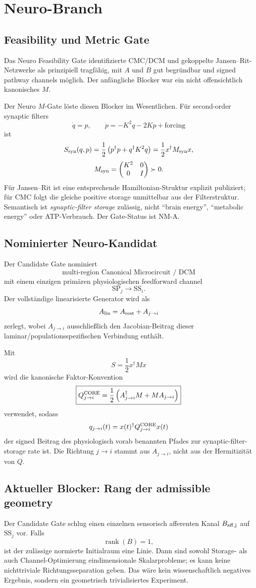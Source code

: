 \section{Neuro-Branch}
\subsection{Feasibility und Metric Gate}
Das Neuro Feasibility Gate identifizierte CMC/DCM und gekoppelte Jansen--Rit-Netzwerke als prinzipiell tragfähig, mit $A$ und $B$ gut begründbar und signed pathway channels möglich. Der anfängliche Blocker war ein nicht offensichtlich kanonisches $M$.

Der Neuro $M$-Gate löste diesen Blocker im Wesentlichen. Für second-order synaptic filters
\[
\dot q=p,
\qquad
\dot p=-K^2q-2Kp+\text{forcing}
\]
ist
\[
S_{\rm syn}(q,p)=\frac12\left(p^\dagger p+q^\dagger K^2q\right)
=\frac12x^\dagger M_{\rm syn}x,
\]
\[
M_{\rm syn}=\begin{pmatrix}K^2&0\\0&I\end{pmatrix}\succ0.
\]
Für Jansen--Rit ist eine entsprechende Hamiltonian-Struktur explizit publiziert; für CMC folgt die gleiche positive storage unmittelbar aus der Filterstruktur. Semantisch ist \emph{synaptic-filter storage} zulässig, nicht ``brain energy'', ``metabolic energy'' oder ATP-Verbrauch. Der Gate-Status ist NM-A.

\subsection{Nominierter Neuro-Kandidat}
Der Candidate Gate nominiert
\[
\boxed{\text{multi-region Canonical Microcircuit / DCM}}
\]
mit einem einzigen primären physiologischen feedforward channel
\[
\boxed{\mathrm{SP}_j\longrightarrow\mathrm{SS}_i}.
\]
Der vollständige linearisierte Generator wird als
\[
A_{\rm lin}=A_{\rm rest}+A_{j\to i}
\]
zerlegt, wobei $A_{j\to i}$ ausschließlich den Jacobian-Beitrag dieser laminar/populationsspezifischen Verbindung enthält.

Mit
\[
S=\frac12x^\dagger Mx
\]
wird die kanonische Faktor-Konvention
\[
\boxed{Q_{j\to i}^{\rm CORE}=\frac12\left(A_{j\to i}^\dagger M+MA_{j\to i}\right)}
\]
verwendet, sodass
\[
q_{j\to i}(t)=x(t)^\dagger Q_{j\to i}^{\rm CORE}x(t)
\]
der signed Beitrag des physiologisch vorab benannten Pfades zur synaptic-filter-storage rate ist. Die Richtung $j\to i$ stammt aus $A_{j\to i}$, nicht aus der Hermitizität von $Q$.

\subsection{Aktueller Blocker: Rang der admissible geometry}
Der Candidate Gate schlug einen einzelnen sensorisch afferenten Kanal $B_{\rm aff,j}$ auf $\mathrm{SS}_j$ vor. Falls
\[
\operatorname{rank}(B)=1,
\]
ist der zulässige normierte Initialraum eine Linie. Dann sind sowohl Storage- als auch Channel-Optimierung eindimensionale Skalarprobleme; es kann keine nichttriviale Richtungsseparation geben. Das wäre kein wissenschaftlich negatives Ergebnis, sondern ein geometrisch trivialisiertes Experiment.

